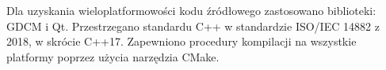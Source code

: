 \par
Dla uzyskania wieloplatformowości kodu źródłowego zastosowano biblioteki: GDCM i Qt.
Przestrzegano standardu C++ w standardzie ISO/IEC 14882 z 2018, w skrócie C++17.
Zapewniono procedury kompilacji na wszystkie platformy poprzez użycia narzędzia CMake.